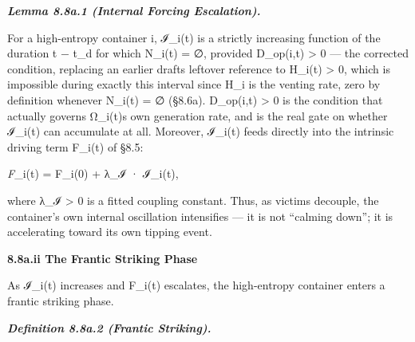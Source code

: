 \documentclass[
]{article}
\begin{document}
\emph{\textbf{Lemma 8.8a.1 (Internal Forcing Escalation).}}

For a high-entropy container i, ℐ\_i(t) is a strictly increasing
function of the duration t − t\_d for which N\_i(t) = ∅, provided
D\_op(i,t) \textgreater{} 0 --- the corrected condition, replacing an
earlier draft\textquotesingle s leftover reference to H\_i(t)
\textgreater{} 0, which is impossible during exactly this interval since
H\_i is the venting rate, zero by definition whenever N\_i(t) = ∅
(§8.6a). D\_op(i,t) \textgreater{} 0 is the condition that actually
governs Ω\_i(t)\textquotesingle s own generation rate, and is the real
gate on whether ℐ\_i(t) can accumulate at all. Moreover, ℐ\_i(t) feeds
directly into the intrinsic driving term F\_i(t) of §8.5:

\emph{F}\_i(t) = F\_i(0) + λ\_ℐ · ℐ\_i(t),

where λ\_ℐ \textgreater{} 0 is a fitted coupling constant. Thus, as
victims decouple, the container's own internal oscillation intensifies
--- it is not ``calming down''; it is accelerating toward its own
tipping event.

\textbf{8.8a.ii The Frantic Striking Phase}

As ℐ\_i(t) increases and F\_i(t) escalates, the high-entropy container
enters a frantic striking phase.

\emph{\textbf{Definition 8.8a.2 (Frantic Striking).}}
\end{document}
